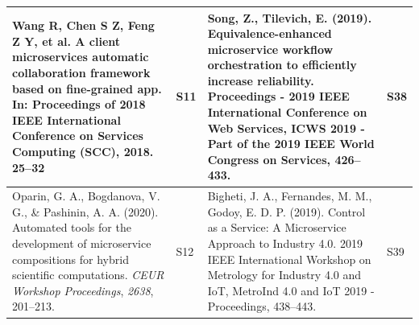\documentclass{article}
\begin{document}
\begin{appendices}
\begin{table}
\begin{center}
\begin{tabular}{ | m{20em} | m{1cm}| m{20em} | m{1cm} | }
\textcolor[rgb]{0.2,0.2,0.2}{Wang R, Chen S Z, Feng Z Y, et al. A client microservices automatic collaboration framework based on fine-grained app. In: Proceedings of 2018 IEEE International Conference on Services Computing (SCC), 2018. 25–32}                                                                                                       & S11            & Song, Z.,  Tilevich, E. (2019). Equivalence-enhanced microservice workflow orchestration to efficiently increase reliability. Proceedings - 2019 IEEE International Conference on Web Services, ICWS 2019 - Part of the 2019 IEEE World Congress on Services, 426–433.                                                                                                                                                         & S38             \\ 
\hline
Oparin, G. A., Bogdanova, V. G., \& Pashinin, A. A. (2020). Automated tools for the development of microservice compositions for hybrid scientific computations. \textit{CEUR Workshop Proceedings}, \textit{2638}, 201–213.~                                                                                                                             & S12            & Bigheti, J. A., Fernandes, M. M.,  Godoy, E. D. P. (2019). Control as a Service: A Microservice Approach to Industry 4.0. 2019 IEEE International Workshop on Metrology for Industry 4.0 and IoT, MetroInd 4.0 and IoT 2019 - Proceedings, 438–443.                                                                                                                                                                            & S39             \\ 
\hline
\end{tabular}
\end{center}
\end{table}

\newpage


\end{appendices}
\end{document}
